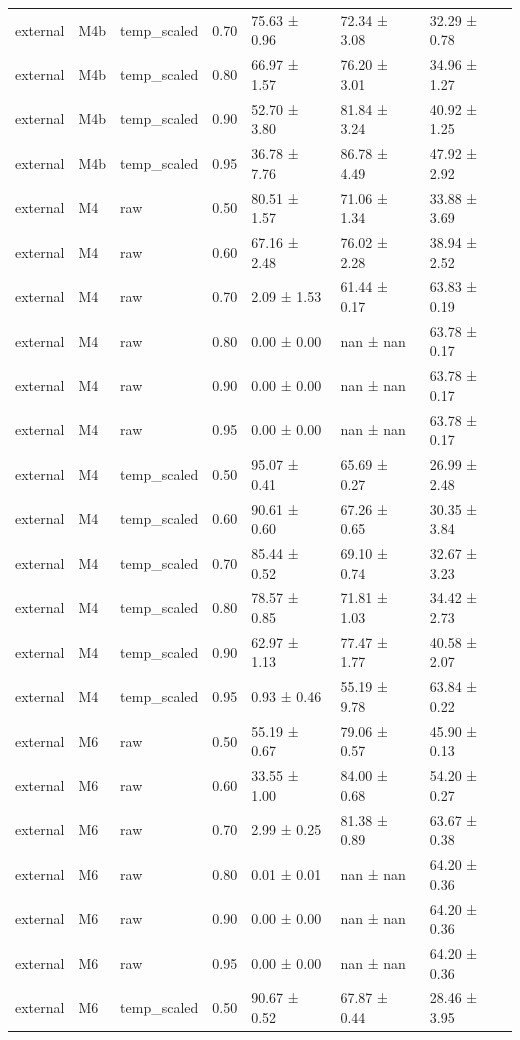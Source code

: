 \begin{tabular}{lllrlll}
external & M4b & temp\_scaled & 0.70 & 75.63 ± 0.96 & 72.34 ± 3.08 & 32.29 ± 0.78 \\
external & M4b & temp\_scaled & 0.80 & 66.97 ± 1.57 & 76.20 ± 3.01 & 34.96 ± 1.27 \\
external & M4b & temp\_scaled & 0.90 & 52.70 ± 3.80 & 81.84 ± 3.24 & 40.92 ± 1.25 \\
external & M4b & temp\_scaled & 0.95 & 36.78 ± 7.76 & 86.78 ± 4.49 & 47.92 ± 2.92 \\
external & M4 & raw & 0.50 & 80.51 ± 1.57 & 71.06 ± 1.34 & 33.88 ± 3.69 \\
external & M4 & raw & 0.60 & 67.16 ± 2.48 & 76.02 ± 2.28 & 38.94 ± 2.52 \\
external & M4 & raw & 0.70 & 2.09 ± 1.53 & 61.44 ± 0.17 & 63.83 ± 0.19 \\
external & M4 & raw & 0.80 & 0.00 ± 0.00 & nan ± nan & 63.78 ± 0.17 \\
external & M4 & raw & 0.90 & 0.00 ± 0.00 & nan ± nan & 63.78 ± 0.17 \\
external & M4 & raw & 0.95 & 0.00 ± 0.00 & nan ± nan & 63.78 ± 0.17 \\
external & M4 & temp\_scaled & 0.50 & 95.07 ± 0.41 & 65.69 ± 0.27 & 26.99 ± 2.48 \\
external & M4 & temp\_scaled & 0.60 & 90.61 ± 0.60 & 67.26 ± 0.65 & 30.35 ± 3.84 \\
external & M4 & temp\_scaled & 0.70 & 85.44 ± 0.52 & 69.10 ± 0.74 & 32.67 ± 3.23 \\
external & M4 & temp\_scaled & 0.80 & 78.57 ± 0.85 & 71.81 ± 1.03 & 34.42 ± 2.73 \\
external & M4 & temp\_scaled & 0.90 & 62.97 ± 1.13 & 77.47 ± 1.77 & 40.58 ± 2.07 \\
external & M4 & temp\_scaled & 0.95 & 0.93 ± 0.46 & 55.19 ± 9.78 & 63.84 ± 0.22 \\
external & M6 & raw & 0.50 & 55.19 ± 0.67 & 79.06 ± 0.57 & 45.90 ± 0.13 \\
external & M6 & raw & 0.60 & 33.55 ± 1.00 & 84.00 ± 0.68 & 54.20 ± 0.27 \\
external & M6 & raw & 0.70 & 2.99 ± 0.25 & 81.38 ± 0.89 & 63.67 ± 0.38 \\
external & M6 & raw & 0.80 & 0.01 ± 0.01 & nan ± nan & 64.20 ± 0.36 \\
external & M6 & raw & 0.90 & 0.00 ± 0.00 & nan ± nan & 64.20 ± 0.36 \\
external & M6 & raw & 0.95 & 0.00 ± 0.00 & nan ± nan & 64.20 ± 0.36 \\
external & M6 & temp\_scaled & 0.50 & 90.67 ± 0.52 & 67.87 ± 0.44 & 28.46 ± 3.95 \\

\end{tabular}
